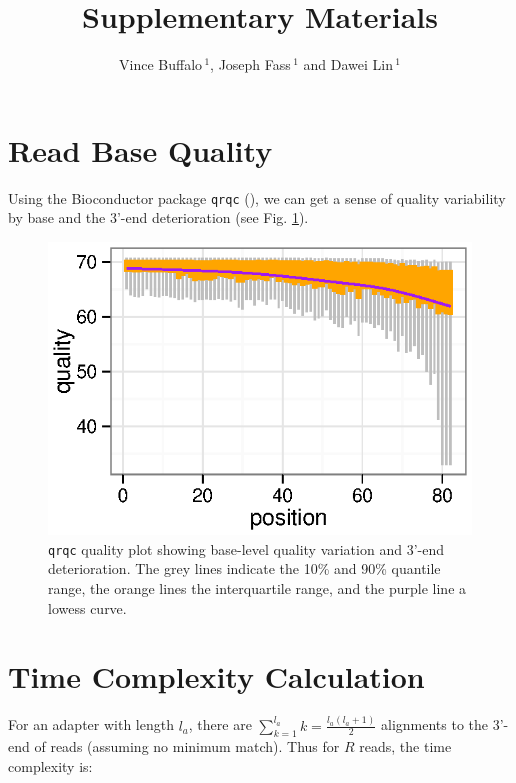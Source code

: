 \documentclass{bioinfo}
\begin{document}
\title[Scythe]{Supplementary Materials}
\author[Buffalo \textit{et~al}]{Vince Buffalo\,$^{1}$, Joseph Fass\,$^{1}$ and Dawei Lin\,$^1$}
\address{$^{1}$Bioinformatics Core, UC Davis Genome Center}


\history{}

\editor{}

\maketitle

\section{Read Base Quality}

Using the Bioconductor package \texttt{qrqc} (\citealp{qrqc}), we can
get a sense of quality variability by base and the 3'-end
deterioration (see Fig. \ref{fig:01}).


\begin{figure}[!tpb]%
\centerline{\includegraphics{graphics/qrqc.eps}}
\caption{\texttt{qrqc} quality plot showing base-level quality
  variation and 3'-end deterioration. The grey lines indicate the 10\%
  and 90\% quantile range, the orange lines the interquartile range,
  and the purple line a lowess curve.}
\label{fig:01}
\end{figure}


\section{Time Complexity Calculation}

For an adapter with length $l_a$, there are 
$\sum_{k=1}^{l_a} k = \frac{l_a (l_a + 1)}{2}$ alignments to the 3'-end of reads (assuming no
minimum match). Thus for $R$ reads, the time complexity is:
\end{document}
